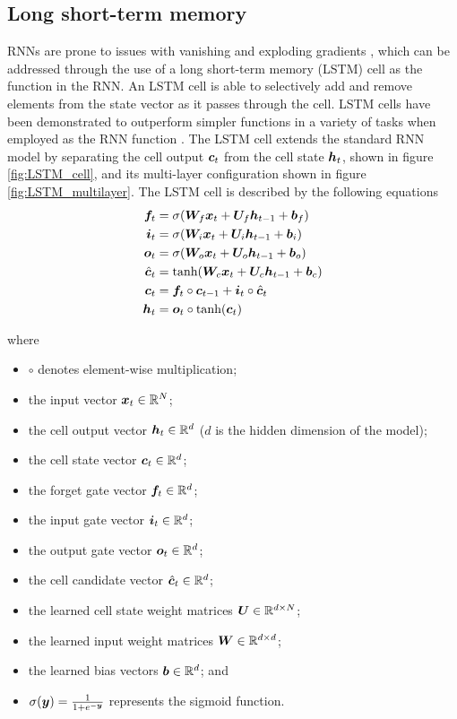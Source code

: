 \subsection{Long short-term memory}
RNNs are prone to issues with vanishing and exploding gradients \cite{Goodfellow-et-al-2016}, which can be addressed through the use of a long short-term memory (LSTM) \cite{hochreiter1997long} cell as the function in the RNN.
An LSTM cell is able to selectively add and remove elements from the state vector as it passes through the cell.
LSTM cells have been demonstrated to outperform simpler functions in a variety of tasks when employed as the RNN function \cite{Chung2014}\cite{jozefowicz2015empirical}\cite{le2015simple}.
The LSTM cell extends the standard RNN model by separating the cell output ${\bm{c}}_t$ from the cell state ${\bm{h}}_t$, shown in figure \ref{fig:LSTM_cell}, and its multi-layer configuration shown in figure \ref{fig:LSTM_multilayer}.
The LSTM cell is described by the following equations
\begin{align}
{\bm{f}}_t &= \sigma({\bm{W}}_{f} {\bm{x}}_t + {\bm{U}}_{f} {\bm{h}}_{t-1} + {\bm{b}}_f) \label{eq:forget_lstm}\\
{\bm{i}}_t &= \sigma({\bm{W}}_{i} {\bm{x}}_t + {\bm{U}}_{i} {\bm{h}}_{t-1} + {\bm{b}}_i) \\
{\bm{o}}_t &= \sigma({\bm{W}}_{o} {\bm{x}}_t + {\bm{U}}_{o} {\bm{h}}_{t-1} + {\bm{b}}_o) \\
\hat{{\bm{c}}}_t &= \text{tanh}({\bm{W}}_{c} {\bm{x}}_t + {\bm{U}}_{c} {\bm{h}}_{t-1} + {\bm{b}}_c) \\
{\bm{c}}_t &= {\bm{f}}_t \circ {\bm{c}}_{t-1} + {\bm{i}}_t \circ \hat{{\bm{c}}}_t \\
{\bm{h}}_t &= {\bm{o}}_t \circ \text{tanh}({\bm{c}}_t) \label{eq:cell_state_lstm}
\end{align}

where 
\begin{itemize}
	\item $\circ$ denotes element-wise multiplication;
	\item the input vector ${\bm{x}}_t \in \mathbb{R}^{N}$;
	\item the cell output vector ${\bm{h}}_t \in \mathbb{R}^{d}$ ($d$ is the hidden dimension of the model);
	\item the cell state vector ${\bm{c}}_t \in \mathbb{R}^{d}$;
	\item  the forget gate vector ${\bm{f}}_t \in \mathbb{R}^{d}$;
	\item the input gate vector ${\bm{i}}_t \in \mathbb{R}^{d}$;
	\item the output gate vector ${\bm{o}}_t \in \mathbb{R}^{d}$;
	\item the cell candidate vector $\hat{{\bm{c}}}_t \in \mathbb{R}^{d}$;
	\item the learned cell state weight matrices ${\bm{U}} \in \mathbb{R}^{d \times N}$;
	\item the learned input weight matrices ${\bm{W}} \in \mathbb{R}^{d \times d}$;
	\item the learned bias vectors ${\bm{b}} \in \mathbb{R}^{d}$; and
	\item $\sigma({\bm{y}}) = \frac{1}{1 + e^{-{\bm{y}}}}$ represents the sigmoid function.
\end{itemize}

